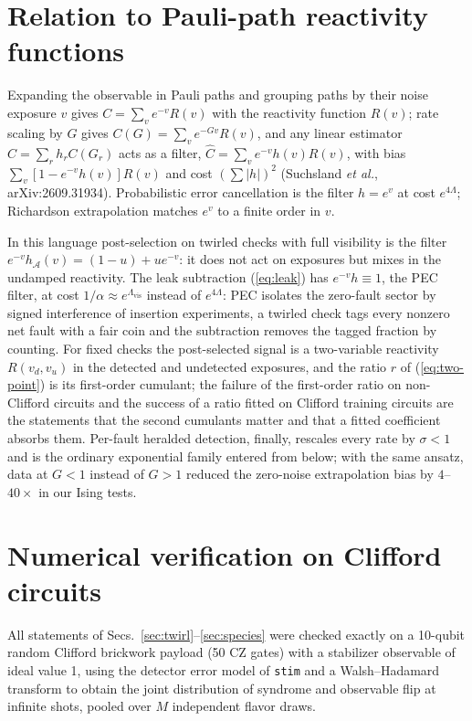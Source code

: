 \documentclass[11pt,a4paper]{article}
\theoremstyle{remark}
\newcommand{\acc}{\mathcal{A}}
\newcommand{\vis}{\mathrm{vis}}
\begin{document}
\section{Relation to Pauli-path reactivity functions}
\label{sec:reactivity}

Expanding the observable in Pauli paths and grouping paths by their noise exposure $v$ gives $C=\sum_ve^{-v}R(v)$ with the reactivity function $R(v)$; rate scaling by $G$ gives $C(G)=\sum_ve^{-Gv}R(v)$, and any linear estimator $\hat C=\sum_rh_rC(G_r)$ acts as a filter, $\hat C=\sum_ve^{-v}h(v)R(v)$, with bias $\sum_v[1-e^{-v}h(v)]R(v)$ and cost $(\sum|h|)^2$ (Suchsland \emph{et al.}, arXiv:2609.31934). Probabilistic error cancellation is the filter $h=e^{v}$ at cost $e^{4\Lambda}$; Richardson extrapolation matches $e^{v}$ to a finite order in $v$.

In this language post-selection on twirled checks with full visibility is the filter $e^{-v}h_\acc(v)=(1-u)+ue^{-v}$: it does not act on exposures but mixes in the undamped reactivity. The leak subtraction (\ref{eq:leak}) has $e^{-v}h\equiv1$, the PEC filter, at cost $1/\alpha\approx e^{\Lambda_\vis}$ instead of $e^{4\Lambda}$: PEC isolates the zero-fault sector by signed interference of insertion experiments, a twirled check tags every nonzero net fault with a fair coin and the subtraction removes the tagged fraction by counting. For fixed checks the post-selected signal is a two-variable reactivity $R(v_d,v_u)$ in the detected and undetected exposures, and the ratio $r$ of (\ref{eq:two-point}) is its first-order cumulant; the failure of the first-order ratio on non-Clifford circuits and the success of a ratio fitted on Clifford training circuits are the statements that the second cumulants matter and that a fitted coefficient absorbs them. Per-fault heralded detection, finally, rescales every rate by $\sigma<1$ and is the ordinary exponential family entered from below; with the same ansatz, data at $G<1$ instead of $G>1$ reduced the zero-noise extrapolation bias by $4$--$40\times$ in our Ising tests.

\section{Numerical verification on Clifford circuits}
\label{sec:clifford}

All statements of Secs.~\ref{sec:twirl}--\ref{sec:species} were checked exactly on a 10-qubit random Clifford brickwork payload (50 CZ gates) with a stabilizer observable of ideal value 1, using the detector error model of \texttt{stim} and a Walsh--Hadamard transform to obtain the joint distribution of syndrome and observable flip at infinite shots, pooled over $M$ independent flavor draws.
\end{document}
